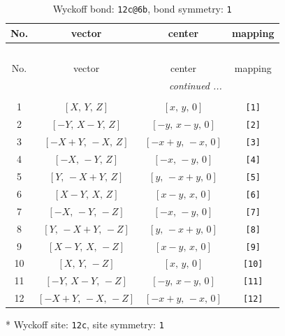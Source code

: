 \documentclass[fleqn,8pt]{jsarticle}
\begin{document}
\begin{longtable}{cccc}
\caption{Wyckoff bond: {\tt 12c@6b}, bond symmetry: {\tt 1}}
 \\
 \hline \hline
No. & vector & center & mapping \\ \hline \endfirsthead

\multicolumn{3}{l}{\tablename\ \thetable{}} \\
 \hline \hline
No. & vector & center & mapping \\ \hline \endhead

 \hline \hline
\multicolumn{3}{r}{\footnotesize\it continued ...} \\ \endfoot

 \hline \hline
\multicolumn{3}{r}{} \\ \endlastfoot

1 & $\left[ X,\, Y,\, Z \right]$ & $\left[ x,\, y,\, 0 \right]$ & {\tt [1]} \\ \hline
2 & $\left[ - Y,\, X - Y,\, Z \right]$ & $\left[ - y,\, x - y,\, 0 \right]$ & {\tt [2]} \\ \hline
3 & $\left[ - X + Y,\, - X,\, Z \right]$ & $\left[ - x + y,\, - x,\, 0 \right]$ & {\tt [3]} \\ \hline
4 & $\left[ - X,\, - Y,\, Z \right]$ & $\left[ - x,\, - y,\, 0 \right]$ & {\tt [4]} \\ \hline
5 & $\left[ Y,\, - X + Y,\, Z \right]$ & $\left[ y,\, - x + y,\, 0 \right]$ & {\tt [5]} \\ \hline
6 & $\left[ X - Y,\, X,\, Z \right]$ & $\left[ x - y,\, x,\, 0 \right]$ & {\tt [6]} \\ \hline
7 & $\left[ - X,\, - Y,\, - Z \right]$ & $\left[ - x,\, - y,\, 0 \right]$ & {\tt [7]} \\ \hline
8 & $\left[ Y,\, - X + Y,\, - Z \right]$ & $\left[ y,\, - x + y,\, 0 \right]$ & {\tt [8]} \\ \hline
9 & $\left[ X - Y,\, X,\, - Z \right]$ & $\left[ x - y,\, x,\, 0 \right]$ & {\tt [9]} \\ \hline
10 & $\left[ X,\, Y,\, - Z \right]$ & $\left[ x,\, y,\, 0 \right]$ & {\tt [10]} \\ \hline
11 & $\left[ - Y,\, X - Y,\, - Z \right]$ & $\left[ - y,\, x - y,\, 0 \right]$ & {\tt [11]} \\ \hline
12 & $\left[ - X + Y,\, - X,\, - Z \right]$ & $\left[ - x + y,\, - x,\, 0 \right]$ & {\tt [12]} \\
\end{longtable}
* Wyckoff site: {\tt 12c}, site symmetry: {\tt 1}
\renewcommand{\arraystretch}{1.2}
\end{document}
